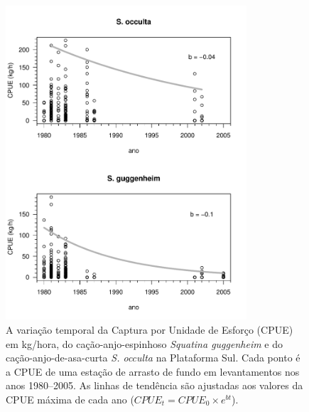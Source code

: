 \documentclass[a4paper,11pt,twoside,showtrims,onecolumn,openright,final]{memoir}
\begin{document}
\begin{figure}
\begin{center}
\includegraphics[width=0.8\textwidth]{Anjos_CPUExDecadas}
\end{center}
\caption[Variação temporal da Captura por Unidade de Esforço em kg/hora de arrasto de fundo, 
	 do cação-anjo-espinhoso \emph{Squatina guggenheim} e do cação-anjo-de-asa-curta \emph{S. occulta} 
	 na Plataforma Sul]
	{A variação temporal da  Captura por Unidade de Esforço (CPUE) em kg/hora, 
	 do cação-anjo-espinhoso \emph{Squatina guggenheim} e do cação-anjo-de-asa-curta \emph{S. occulta} 
	 na Plataforma Sul. 
	 Cada ponto é a CPUE de uma estação de arrasto de fundo em levantamentos 
	 nos anos 1980--2005. As linhas de tendência são ajustadas aos valores 
	 da CPUE máxima de cada ano ($CPUE_{t} = CPUE_{0} \times e^{bt}$).}
\label{fig:anjos-cpue-porano-dadospreteritos}
\end{figure}



%
\end{document}
